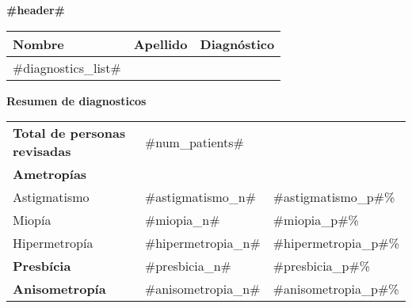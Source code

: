 \documentclass[12pt]{article}
\begin{document}
	\begin{center}\textbf{#header#}\end{center}

	\renewcommand{\arraystretch}{1.3}
	\begin{center}
		{\footnotesize
			\begin{longtable}{l l l}
				\textbf{Nombre} & \textbf{Apellido} & \textbf{Diagnóstico}\\ \hline \hline
				#diagnostics_list#
				\hline
			\end{longtable}
		}
	\end{center}

	\textbf{Resumen de diagnosticos}
	\begin{center}
		\begin{tabular}{l p{1.5cm} p{1.5cm}}
			\textbf{Total de personas revisadas\hspace{1.5cm}} & #num_patients# & \\
			\hspace{1cm} \textbf{Ametropías} & & \\
			\hspace{2cm} Astigmatismo & #astigmatismo_n# & #astigmatismo_p#\% \\
			\hspace{2cm} Miopía & #miopia_n# & #miopia_p#\% \\
			\hspace{2cm} Hipermetropía & #hipermetropia_n# & #hipermetropia_p#\% \\
			\hspace{1cm} \textbf{Presbícia} & #presbicia_n# & #presbicia_p#\% \\
			\hspace{1cm} \textbf{Anisometropía} & #anisometropia_n# & #anisometropia_p#\% \\
		\end{tabular}
	\end{center}
\end{document}
